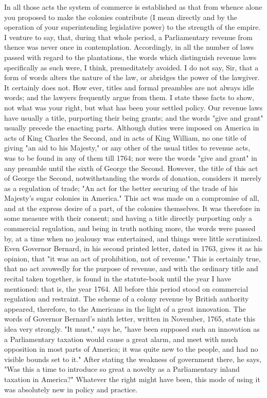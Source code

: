 In all those acts the system of commerce is established as that from whence alone you proposed to make the colonies contribute (I mean directly and by the operation of your superintending legislative power) to the strength of the empire. I venture to say, that, during that whole period, a Parliamentary revenue from thence was never once in contemplation. Accordingly, in all the number of laws passed with regard to the plantations, the words which distinguish revenue laws specifically as such were, I think, premeditately avoided. I do not say, Sir, that a form of words alters the nature of the law, or abridges the power of the lawgiver. It certainly does not. How ever, titles and formal preambles are not always idle words; and the lawyers frequently argue from them. I state these facts to show, not what was your right, but what has been your settled policy. Our revenue laws have usually a title, purporting their being grants; and the words "give and grant" usually precede the enacting parts. Although duties were imposed on America in acts of King Charles the Second, and in acts of King William, no one title of giving "an aid to his Majesty," or any other of the usual titles to revenue acts, was to be found in any of them till 1764; nor were the words "give and grant" in any preamble until the sixth of George the Second. However, the title of this act of George the Second, notwithstanding the words of donation, considers it merely as a regulation of trade; "An act for the better securing of the trade of his Majesty's sugar colonies in America." This act was made on a compromise of all, and at the express desire of a part, of the colonies themselves. It was therefore in some measure with their consent; and having a title directly purporting only a commercial regulation, and being in truth nothing more, the words were passed by, at a time when no jealousy was entertained, and things were little scrutinized. Even Governor Bernard, in his second printed letter, dated in 1763, gives it as his opinion, that "it was an act of prohibition, not of revenue." This is certainly true, that no act avowedly for the purpose of revenue, and with the ordinary title and recital taken together, is found in the statute-book until the year I have mentioned: that is, the year 1764. All before this period stood on commercial regulation and restraint. The scheme of a colony revenue by British authority appeared, therefore, to the Americans in the light of a great innovation. The words of Governor Bernard's ninth letter, written in November, 1765, state this idea very strongly. "It must," says he, "have been supposed such an innovation as a Parliamentary taxation would cause a great alarm, and meet with much opposition in most parts of America; it was quite new to the people, and had no visible bounds set to it." After stating the weakness of government there, he says, "Was this a time to introduce so great a novelty as a Parliamentary inland taxation in America?" Whatever the right might have been, this mode of using it was absolutely new in policy and practice.

